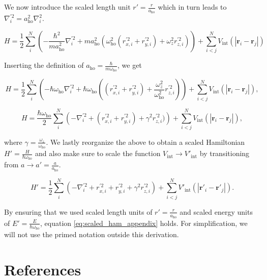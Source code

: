 \documentclass[
]{article}
\begin{document}
We now introduce the scaled length unit \(r' = \frac{r}{a_\text{ho}}\)
which in turn leads to
\(\nabla^{\prime 2}_i = a_\text{ho}^2\nabla_i^2\).

\[ H = \frac{1}{2}\sum_i^N \left(-\frac{\hbar^2}{ma_\text{ho}^2}\nabla^{\prime 2}_i  + ma_\text{ho}^2\left(\omega_\text{ho}^2(r_{x, i}^{\prime 2} + r_{y, i}^{\prime 2}) + \omega_z^2 r_{z, i}^{\prime 2}\right)\right) + \sum_{i<j}^N V_\text{int}(|\mathbf r_i - \mathbf r_j|)\]

Inserting the definition of
\(a_\text{ho} = \frac{\hbar}{m\omega_\text{ho}}\), we get

\[ H = \frac{1}{2}\sum_i^N \left(-\hbar\omega_\text{ho}\nabla^{\prime 2}_i  + \hbar\omega_\text{ho}\left((r_{x, i}^{\prime 2} + r_{y, i}^{\prime 2}) + \frac{\omega_z^2}{\omega_\text{ho}^2} r_{z, i}^{\prime 2}\right)\right) + \sum_{i<j}^N V_\text{int}(|\mathbf r_i - \mathbf r_j|), \]

\[ H = \frac{\hbar\omega_\text{ho}}{2}\sum_i^N \left(-\nabla^{\prime 2}_i  + (r_{x, i}^{\prime 2} + r_{y, i}^{\prime 2}) + \gamma^2 r_{z, i}^{\prime 2})\right) + \sum_{i<j}^N V_\text{int}(|\mathbf r_i - \mathbf r_j|), \]

where \(\gamma = \frac{\omega_z}{\omega_\text{ho}}\). We lastly
reorganize the above to obtain a scaled Hamiltonian
\(H' = \frac{H}{\hbar\omega_\text{ho}}\) and also make sure to scale the
function \(V_\text{int}\rightarrow V'_\text{int}\) by transitioning from
\(a\rightarrow a' = \frac{a}{a_\text{ho}}\).

\begin{equation} H' = \frac{1}{2}\sum_i^N \left(-\nabla_i^{\prime 2} + r_{x, i}^{\prime 2} + r_{y, i}^{\prime 2} + \gamma^2 r_{z, i}^{\prime 2}\right) + \sum_{i<j}^N V'_\text{int}(|\mathbf r'_i - \mathbf r'_j|) .\label{eq:scaled_ham_appendix}\end{equation}

By ensuring that we used scaled length units of
\(r' = \frac{r}{a_\text{ho}}\) and scaled energy units of
\(E' = \frac{E}{\hbar\omega_\text{ho}}\), equation
\eqref{eq:scaled_ham_appendix} holds. For simplification, we will not
use the primed notation outside this derivation.

\hypertarget{bibliography}{%
\section*{References}\label{bibliography}}
\end{document}
